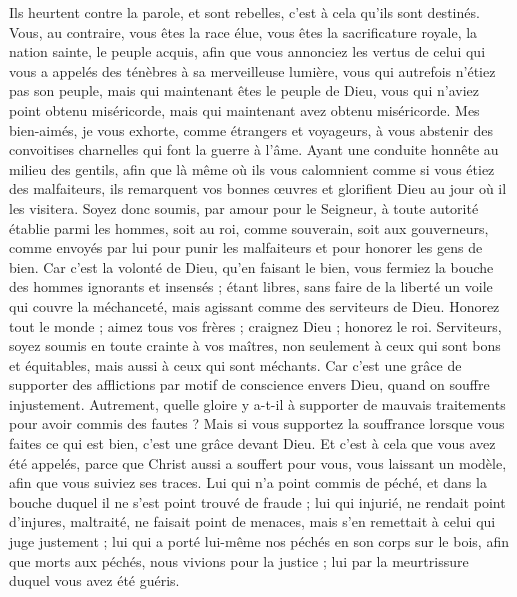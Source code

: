 \begin{multicols}{2}
Ils heurtent contre la parole, et sont rebelles, c’est à cela qu’ils sont destinés.
Vous, au contraire, vous êtes la race élue, vous êtes la sacrificature royale, la nation sainte, le peuple acquis, afin que vous annonciez les vertus de celui qui vous a appelés des ténèbres à sa merveilleuse lumière,
vous qui autrefois n'étiez pas son peuple, mais qui maintenant êtes le peuple de Dieu, vous qui n'aviez point obtenu miséricorde, mais qui maintenant avez obtenu miséricorde.
Mes bien-aimés, je vous exhorte, comme étrangers et voyageurs, à vous abstenir des convoitises charnelles qui font la guerre à l'âme.
Ayant une conduite honnête au milieu des gentils, afin que là même où ils vous calomnient comme si vous étiez des malfaiteurs, ils remarquent vos bonnes œuvres et glorifient Dieu au jour où il les visitera.
Soyez donc soumis, par amour pour le Seigneur, à toute autorité établie parmi les hommes, soit au roi, comme souverain,
soit aux gouverneurs, comme envoyés par lui pour punir les malfaiteurs et pour honorer les gens de bien.
Car c'est la volonté de Dieu, qu'en faisant le bien, vous fermiez la bouche des hommes ignorants et insensés ;
étant libres, sans faire de la liberté un voile qui couvre la méchanceté, mais agissant comme des serviteurs de Dieu.
Honorez tout le monde ; aimez tous vos frères ; craignez Dieu ; honorez le roi.
Serviteurs, soyez soumis en toute crainte à vos maîtres, non seulement à ceux qui sont bons et équitables, mais aussi à ceux qui sont méchants.
Car c’est une grâce de supporter des afflictions par motif de conscience envers Dieu, quand on souffre injustement.
Autrement, quelle gloire y a-t-il à supporter de mauvais traitements pour avoir commis des fautes ? Mais si vous supportez la souffrance lorsque vous faites ce qui est bien, c’est une grâce devant Dieu.
Et c’est à cela que vous avez été appelés, parce que Christ aussi a souffert pour vous, vous laissant un modèle, afin que vous suiviez ses traces.
Lui qui n'a point commis de péché, et dans la bouche duquel il ne s’est point trouvé de fraude ;
lui qui injurié, ne rendait point d’injures, maltraité, ne faisait point de menaces, mais s’en remettait à celui qui juge justement ;
lui qui a porté lui-même nos péchés en son corps sur le bois, afin que morts aux péchés, nous vivions pour la justice ; lui par la meurtrissure duquel vous avez été guéris.

\end{multicols}
